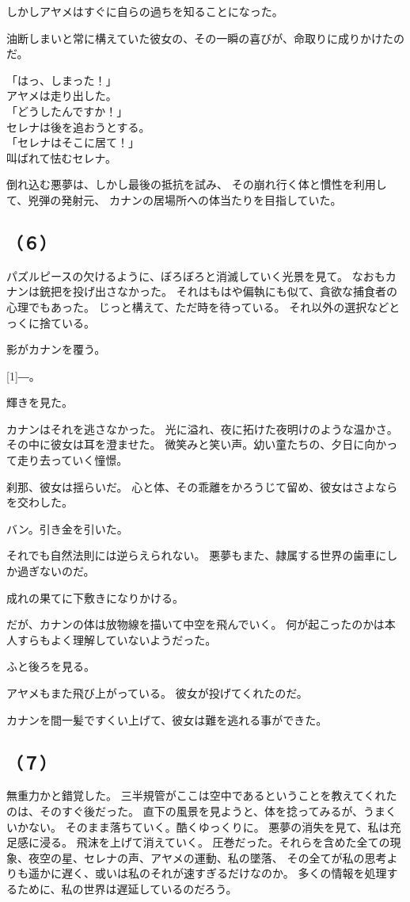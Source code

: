 \documentclass[../IHMain]{subfiles}
\begin{document}
しかしアヤメはすぐに自らの過ちを知ることになった。

油断しまいと常に構えていた彼女の、その一瞬の喜びが、命取りに成りかけたのだ。

「はっ、しまった！」\\
アヤメは走り出した。\\
「どうしたんですか！」\\
セレナは後を追おうとする。\\
「セレナはそこに居て！」\\
叫ばれて怯むセレナ。

倒れ込む悪夢は、しかし最後の抵抗を試み、
その崩れ行く体と慣性を利用して、兇弾の発射元、
カナンの居場所への体当たりを目指していた。

\subsection*{（６）}

パズルピースの欠けるように、ぼろぼろと消滅していく光景を見て。
なおもカナンは銃把を投げ出さなかった。
それはもはや偏執にも似て、貪欲な捕食者の心理でもあった。
じっと構えて、ただ時を待っている。
それ以外の選択などとっくに捨ている。

影がカナンを覆う。

\scalebox{6}[1]{―}。

輝きを見た。

カナンはそれを逃さなかった。
光に溢れ、夜に拓けた夜明けのような温かさ。
その中に彼女は耳を澄ませた。
微笑みと笑い声。幼い童たちの、夕日に向かって走り去っていく憧憬。

刹那、彼女は揺らいだ。
心と体、その乖離をかろうじて留め、彼女はさよならを交わした。

バン。引き金を引いた。

それでも自然法則には逆らえられない。
悪夢もまた、隷属する世界の歯車にしか過ぎないのだ。

成れの果てに下敷きになりかける。

だが、カナンの体は放物線を描いて中空を飛んでいく。
何が起こったのかは本人すらもよく理解していないようだった。

ふと後ろを見る。

アヤメもまた飛び上がっている。
彼女が投げてくれたのだ。

カナンを間一髪ですくい上げて、彼女は難を逃れる事ができた。

\subsection*{（７）}
無重力かと錯覚した。
三半規管がここは空中であるということを教えてくれたのは、そのすぐ後だった。
直下の風景を見ようと、体を捻ってみるが、うまくいかない。
そのまま落ちていく。酷くゆっくりに。
悪夢の消失を見て、私は充足感に浸る。
飛沫を上げて消えていく。
圧巻だった。それらを含めた全ての現象、夜空の星、セレナの声、アヤメの運動、私の墜落、
その全てが私の思考よりも遥かに遅く、或いは私のそれが速すぎるだけなのか。
多くの情報を処理するために、私の世界は遅延しているのだろう。
\end{document}
